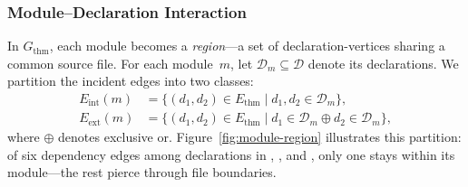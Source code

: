 \subsubsection{Module--Declaration Interaction}
\label{sec:cohesion}

In $G_{\mathrm{thm}}$, each module becomes a \emph{region}---a set of declaration-vertices sharing a common source file. For each module~$m$, let $\mathcal{D}_m \subseteq \mathcal{D}$ denote its declarations. We partition the incident edges into two classes:
\begin{align*}
  E_{\mathrm{int}}(m) &= \{(d_1, d_2) \in E_{\mathrm{thm}} \mid d_1, d_2 \in \mathcal{D}_m\}, \\
  E_{\mathrm{ext}}(m) &= \{(d_1, d_2) \in E_{\mathrm{thm}} \mid d_1 \in \mathcal{D}_m \oplus d_2 \in \mathcal{D}_m\},
\end{align*}
where $\oplus$ denotes exclusive or. Figure~\ref{fig:module-region} illustrates this partition: of six dependency edges among declarations in , , and , only one stays within its module---the rest pierce through file boundaries.


